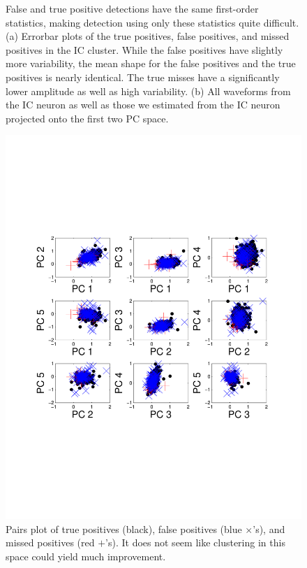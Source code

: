 \begin{center}
\begin{figure}
\begin{subfigure}[b]{.5\textwidth}
\caption{}
\label{fig:ICold}
\end{subfigure}
\caption{False and true positive detections have the same first-order statistics, making detection using only these statistics quite difficult.  (a)
 Errorbar plots of the true positives, false positives, and missed positives  in the IC cluster.  While the false positives have slightly more variability, the mean shape for the false positives and the true positives is nearly identical.  The true misses have a significantly lower amplitude as well as high variability. (b) All waveforms from the IC neuron as well as those we estimated from the IC neuron projected onto the first two PC space.} \label{fig:IC-PCA}
\end{figure}
\end{center}

\begin{center}
\begin{figure}[h!]
		\includegraphics[width=\linewidth]{../figs/new/pairs.pdf}
	\caption{Pairs plot of true positives (black), false positives (blue $\times$'s), and missed positives (red $+$'s).  It does not seem like clustering in this space could yield much improvement. }
	\label{fig:pairs}
\end{figure}
\end{center}

